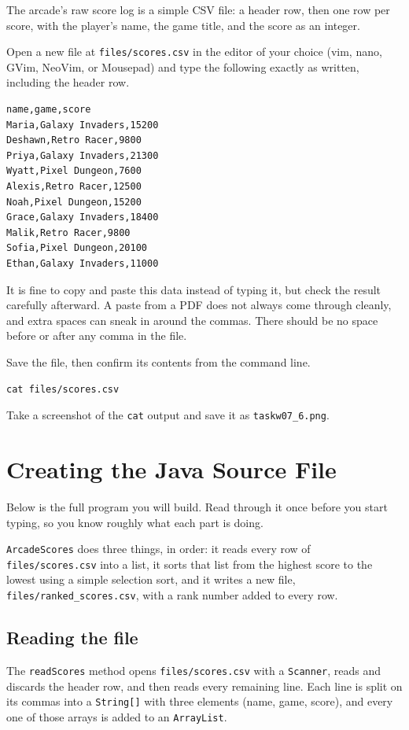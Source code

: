 \documentclass[11pt]{article}
\begin{document}
The arcade's raw score log is a simple CSV file: a header row, then one row
per score, with the player's name, the game title, and the score as an
integer.

Open a new file at \texttt{files/scores.csv} in the editor of your choice
(vim, nano, GVim, NeoVim, or Mousepad) and type the following exactly as written,
including the header row.

\begin{lstlisting}[language={}]
name,game,score
Maria,Galaxy Invaders,15200
Deshawn,Retro Racer,9800
Priya,Galaxy Invaders,21300
Wyatt,Pixel Dungeon,7600
Alexis,Retro Racer,12500
Noah,Pixel Dungeon,15200
Grace,Galaxy Invaders,18400
Malik,Retro Racer,9800
Sofia,Pixel Dungeon,20100
Ethan,Galaxy Invaders,11000
\end{lstlisting}

It is fine to copy and paste this data instead of typing it, but check the
result carefully afterward. A paste from a PDF does not always come through
cleanly, and extra spaces can sneak in around the commas. There should be no
space before or after any comma in the file.

Save the file, then confirm its contents from the command line.

\begin{lstlisting}[language={}]
cat files/scores.csv
\end{lstlisting}

Take a screenshot of the \texttt{cat} output and save it as
\texttt{taskw07\_6.png}.

\section{Creating the Java Source File}

Below is the full program you will build. Read through it once before you
start typing, so you know roughly what each part is doing.

\texttt{ArcadeScores} does three things, in order: it reads every row of
\texttt{files/scores.csv} into a list, it sorts that list from the highest
score to the lowest using a simple selection sort, and it writes a new file,
\texttt{files/ranked\_scores.csv}, with a rank number added to every row.

\subsection{Reading the file}
The \texttt{readScores} method opens \texttt{files/scores.csv} with a
\texttt{Scanner}, reads and discards the header row, and then reads every
remaining line. Each line is split on its commas into a \texttt{String[]}
with three elements (name, game, score), and every one of those arrays is
added to an \texttt{ArrayList}.
\end{document}
